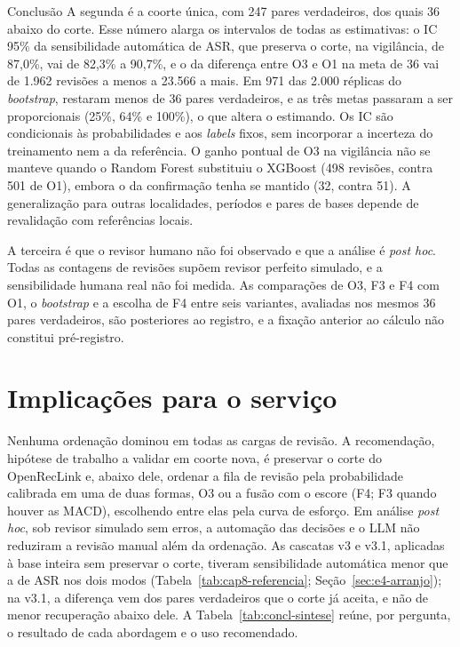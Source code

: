 \begin{chapter}{Conclusão}
A segunda é a coorte única, com 247 pares verdadeiros, dos quais 36 abaixo do corte. Esse número alarga os intervalos de todas as estimativas: o IC 95\% da sensibilidade automática de ASR, que preserva o corte, na vigilância, de 87,0\%, vai de 82,3\% a 90,7\%, e o da diferença entre O3 e O1 na meta de 36 vai de 1.962 revisões a menos a 23.566 a mais. Em 971 das 2.000 réplicas do \textit{bootstrap}, restaram menos de 36 pares verdadeiros, e as três metas passaram a ser proporcionais (25\%, 64\% e 100\%), o que altera o estimando. Os IC são condicionais às probabilidades e aos \textit{labels} fixos, sem incorporar a incerteza do treinamento nem a da referência. O ganho pontual de O3 na vigilância não se manteve quando o Random Forest substituiu o XGBoost (498 revisões, contra 501 de O1), embora o da confirmação tenha se mantido (32, contra 51). A generalização para outras localidades, períodos e pares de bases depende de revalidação com referências locais.

A terceira é que o revisor humano não foi observado e que a análise é \textit{post hoc}. Todas as contagens de revisões supõem revisor perfeito simulado, e a sensibilidade humana real não foi medida. As comparações de O3, F3 e F4 com O1, o \textit{bootstrap} e a escolha de F4 entre seis variantes, avaliadas nos mesmos 36 pares verdadeiros, são posteriores ao registro, e a fixação anterior ao cálculo não constitui pré-registro.

\section{Implicações para o serviço}\label{sec:concl-recomendacoes}

Nenhuma ordenação dominou em todas as cargas de revisão. A recomendação, hipótese de trabalho a validar em coorte nova, é preservar o corte do OpenRecLink e, abaixo dele, ordenar a fila de revisão pela probabilidade calibrada em uma de duas formas, O3 ou a fusão com o escore (F4; F3 quando houver as MACD), escolhendo entre elas pela curva de esforço. Em análise \textit{post hoc}, sob revisor simulado sem erros, a automação das decisões e o LLM não reduziram a revisão manual além da ordenação. As cascatas v3 e v3.1, aplicadas à base inteira sem preservar o corte, tiveram sensibilidade automática menor que a de ASR nos dois modos (Tabela~\ref{tab:cap8-referencia}; Seção~\ref{sec:e4-arranjo}); na v3.1, a diferença vem dos pares verdadeiros que o corte já aceita, e não de menor recuperação abaixo dele. A Tabela~\ref{tab:concl-sintese} reúne, por pergunta, o resultado de cada abordagem e o uso recomendado.


\end{chapter}
